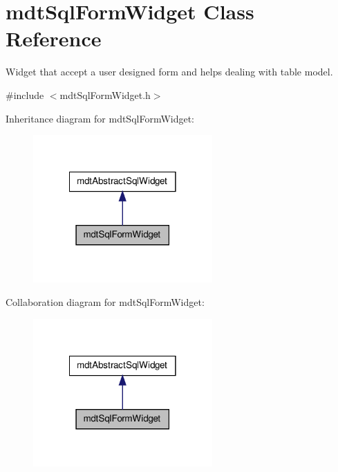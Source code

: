 \hypertarget{classmdt_sql_form_widget}{
\section{mdtSqlFormWidget Class Reference}
\label{classmdt_sql_form_widget}
}


Widget that accept a user designed form and helps dealing with table model.  




{\ttfamily \#include $<$mdtSqlFormWidget.h$>$}



Inheritance diagram for mdtSqlFormWidget:\nopagebreak
\begin{figure}[H]
\begin{center}
\leavevmode
\includegraphics[width=194pt]{classmdt_sql_form_widget__inherit__graph}
\end{center}
\end{figure}


Collaboration diagram for mdtSqlFormWidget:\nopagebreak
\begin{figure}[H]
\begin{center}
\leavevmode
\includegraphics[width=194pt]{classmdt_sql_form_widget__coll__graph}
\end{center}
\end{figure}
